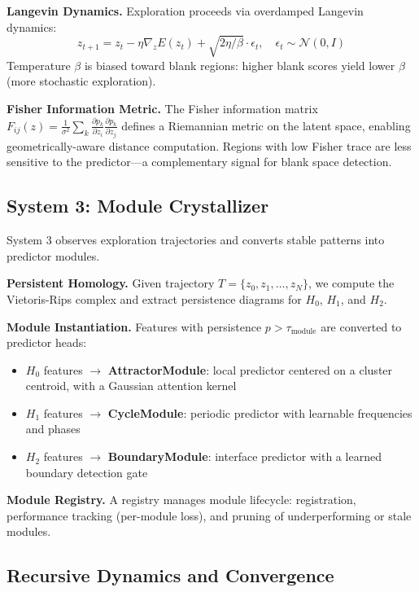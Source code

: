 \documentclass[10pt,twocolumn]{article}
\begin{document}
\textbf{Langevin Dynamics.} Exploration proceeds via overdamped Langevin dynamics:
\begin{equation}
    z_{t+1} = z_t - \eta \nabla_z E(z_t) + \sqrt{2\eta/\beta} \cdot \epsilon_t, \quad \epsilon_t \sim \mathcal{N}(0, I)
\end{equation}
Temperature $\beta$ is biased toward blank regions: higher blank scores yield lower $\beta$ (more stochastic exploration).

\textbf{Fisher Information Metric.} The Fisher information matrix $F_{ij}(z) = \frac{1}{\sigma^2}\sum_k \frac{\partial p_k}{\partial z_i}\frac{\partial p_k}{\partial z_j}$ defines a Riemannian metric on the latent space, enabling geometrically-aware distance computation. Regions with low Fisher trace are less sensitive to the predictor---a complementary signal for blank space detection.

\subsection{System 3: Module Crystallizer}

System 3 observes exploration trajectories and converts stable patterns into predictor modules.

\textbf{Persistent Homology.} Given trajectory $T = \{z_0, z_1, \ldots, z_N\}$, we compute the Vietoris-Rips complex and extract persistence diagrams for $H_0$, $H_1$, and $H_2$.

\textbf{Module Instantiation.} Features with persistence $p > \tau_{\text{module}}$ are converted to predictor heads:
\begin{itemize}
    \item $H_0$ features $\rightarrow$ \textbf{AttractorModule}: local predictor centered on a cluster centroid, with a Gaussian attention kernel
    \item $H_1$ features $\rightarrow$ \textbf{CycleModule}: periodic predictor with learnable frequencies and phases
    \item $H_2$ features $\rightarrow$ \textbf{BoundaryModule}: interface predictor with a learned boundary detection gate
\end{itemize}

\textbf{Module Registry.} A registry manages module lifecycle: registration, performance tracking (per-module loss), and pruning of underperforming or stale modules.

\subsection{Recursive Dynamics and Convergence}
\end{document}
